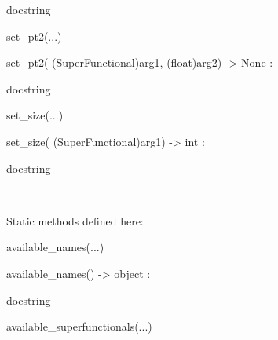 \documentclass[letterpaper,10pt,english]{sphinxmanual}
\begin{document}
\begin{description}
\begin{description}
\begin{DUlineblock}{0em}
\begin{DUlineblock}{\DUlineblockindent}
\begin{DUlineblock}{\DUlineblockindent}
\item[] docstring
\item[] 
\end{DUlineblock}
\end{DUlineblock}
\item[] set\_pt2(...)
\item[]
\begin{DUlineblock}{\DUlineblockindent}
\item[] set\_pt2( (SuperFunctional)arg1, (float)arg2) -\textgreater{} None :
\item[]
\begin{DUlineblock}{\DUlineblockindent}
\item[] docstring
\item[] 
\end{DUlineblock}
\end{DUlineblock}
\item[] set\_size(...)
\item[]
\begin{DUlineblock}{\DUlineblockindent}
\item[] set\_size( (SuperFunctional)arg1) -\textgreater{} int :
\item[]
\begin{DUlineblock}{\DUlineblockindent}
\item[] docstring
\item[] 
\end{DUlineblock}
\end{DUlineblock}
\item[] ----------------------------------------------------------------------
\item[] Static methods defined here:
\item[] 
\item[] available\_names(...)
\item[]
\begin{DUlineblock}{\DUlineblockindent}
\item[] available\_names() -\textgreater{} object :
\item[]
\begin{DUlineblock}{\DUlineblockindent}
\item[] docstring
\item[] 
\end{DUlineblock}
\end{DUlineblock}
\item[] available\_superfunctionals(...)
\item[]
\begin{DUlineblock}{\DUlineblockindent}

\end{DUlineblock}
\end{DUlineblock}
\end{description}
\end{description}
\end{document}
